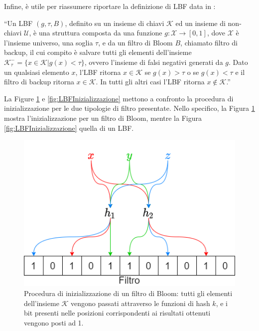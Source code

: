 \documentclass[../../main.tex]{subfiles}
\begin{document}
    Infine, è utile per riassumere riportare la definizione di LBF data in \cite{10.5555/3326943.3326986}: 

    ``Un LBF $(g, \tau, B)$, definito su un insieme di chiavi $\mathcal{K}$ ed un insieme di non-chiavi $\mathcal{U}$, è una struttura composta da una funzione $g : \mathcal{X} \rightarrow [0,1]$, dove $\mathcal{X}$ è l'insieme universo, una soglia $\tau$, e da un filtro di Bloom $B$, chiamato filtro di backup, il cui compito è salvare tutti gli elementi dell'insieme $\mathcal{K}_{\tau}^- = \{x \in \mathcal{K} | g(x) < \tau\}$, ovvero l'insieme di falsi negativi generati da $g$. Dato un qualsiasi elemento $x$, l'LBF ritorna $x \in \mathcal{K}$ se $g(x) > \tau$ o se $g(x) < \tau$ e il filtro di backup ritorna $x \in \mathcal{K}$. In tutti gli altri casi l'LBF ritorna $x\notin \mathcal{K}$.''

    La Figure \ref{fig:BFInizializzazione} e \ref{fig:LBFInizializzazione} mettono a confronto la procedura di inizializzazione per le due tipologie di filtro presentate. Nello specifico, la Figura \ref{fig:BFInizializzazione} mostra l'inizializzazione per un filtro di Bloom, mentre la Figura \ref{fig:LBFInizializzazione} quella di un LBF.

    \begin{figure}[H]
        \centering
        \includegraphics[width=\textwidth]{immagini/5_1/BFInizializzazione.png}
        \caption{Procedura di inizializzazione di un filtro di Bloom: tutti gli elementi dell'insieme $\mathcal{K}$ vengono passati attraverso le funzioni di hash $k$, e i bit presenti nelle posizioni corrispondenti ai risultati ottenuti vengono posti ad 1.}
        \label{fig:BFInizializzazione}
    \end{figure}
\end{document}
